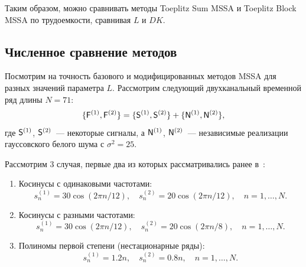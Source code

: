 \documentclass[specialist,
substylefile = spbu_report.rtx,
subf,href,colorlinks=true, 12pt]{disser}
\theoremstyle{definition}
\begin{document}
Таким образом, можно сравнивать методы Toeplitz Sum MSSA и Toeplitz Block MSSA по трудоемкости, сравнивая $L$ и $DK$.


\subsection{Численное сравнение методов}
Посмотрим на точность базового и модифицированных методов MSSA для разных значений параметра $L$. Рассмотрим следующий двухканальный временной ряд длины ${N=71}$:
$$\{\mathsf{F}^{(1)}, \mathsf{F}^{(2)}\}=\{\mathsf{S}^{(1)},\mathsf{S}^{(2)}\} + \{\mathsf{N}^{(1)},\mathsf{N}^{(2)}\},$$
где $\mathsf{S}^{(1)}$, $\mathsf{S}^{(2)}$~--- некоторые сигналы, а $\mathsf{N}^{(1)}$, $\mathsf{N}^{(2)}$~--- независимые реализации гауссовского белого шума с $\sigma^2=25$.

Рассмотрим 3 случая, первые два из которых рассматривались ранее в~\cite{Golyandina2015}:
\begin{enumerate}
	\item Косинусы с одинаковыми частотами:
	      \[
		      s_n^{(1)}=30\cos(2\pi n/12),\quad s_n^{(2)}=20\cos(2\pi n/12),\quad n=1,\ldots, N.
	      \]
	\item Косинусы с разными частотами:
	      \[
		      s_n^{(1)}=30\cos(2\pi n/12),\quad s_n^{(2)}=20\cos(2\pi n/8),\quad n=1,\ldots, N.
	      \]
	\item Полиномы первой степени (нестационарные ряды):
	      \[
		      s_n^{(1)}=1.2n,\quad s_n^{(2)}=0.8n,\quad n=1,\ldots,N.
	      \]
\end{enumerate}
\end{document}
